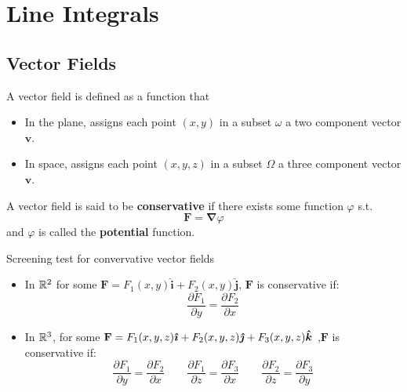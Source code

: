 \chapter{Line Integrals}
	\section{Vector Fields}
	\begin{definition} A vector field is defined as a function that
		\begin{itemize}
			\item In the plane, assigns each point $(x,y)$ in a subset $\omega$ a two component vector $\mathbf{v}$.
			\item In space, assigns each point $(x,y,z)$ in a subset $\Omega$ a three component vector $\mathbf{v}$.
		\end{itemize}
	\end{definition}
	\begin{definition}
		A vector field is said to be \textbf{conservative} if there exists some function $\varphi$ s.t. \[
			\mathbf{F} = \bm{\nabla}\varphi
		\] 
	and $\varphi$ is called the \textbf{potential} function.
	\end{definition}
	\begin{theorem}
		Screening test for convervative vector fields
		\begin{itemize}
			\item In $\mathbb{R}^{2}$ for some $\mathbf{F} = F_1(x,y)\hat{\bm{i}} + F_2(x,y)\hat{\bm{j}}$, $\mathbf{F}$ is conservative if:
				\[
				\frac{\partial F_1}{\partial y} = \frac{\partial F_2}{\partial x} 
				\] 
			\item In $\mathbb{R}^{3}$, for some $\mathbf{F} = F_1(x,y,z)\bm {\hat \imath} + F_2(x,y,z)\bm {\hat \jmath} + F_3(x,y,z)\bm {\hat k}$
				,$\mathbf{F}$ is conservative if:
				\[
					\frac{\partial F_1}{\partial y} = \frac{\partial F_2}{\partial x} \qquad \frac{\partial F_1}{\partial z}  = \frac{\partial F_3}{\partial x} \qquad \frac{\partial F_2}{\partial z}  = \frac{\partial F_3}{\partial y} 
				\] 
		\end{itemize} 
	\end{theorem}
